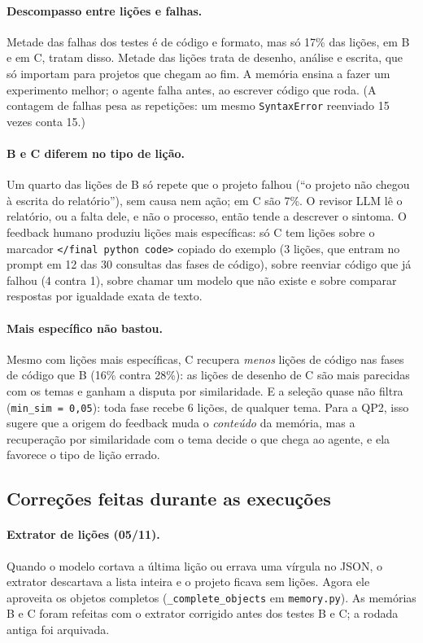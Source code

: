 \documentclass[11pt,a4paper]{article}
\begin{document}
\paragraph{Descompasso entre lições e falhas.} Metade das falhas dos testes é de código e formato,
mas só 17\% das lições, em B e em C, tratam disso. Metade das lições trata de desenho, análise e
escrita, que só importam para projetos que chegam ao fim. A memória ensina a fazer um
experimento melhor; o agente falha antes, ao escrever código que roda. (A contagem de falhas
pesa as repetições: um mesmo \texttt{SyntaxError} reenviado 15 vezes conta 15.)

\paragraph{B e C diferem no tipo de lição.} Um quarto das lições de B só repete que o projeto
falhou (``o projeto não chegou à escrita do relatório''), sem causa nem ação; em C são 7\%. O
revisor LLM lê o relatório, ou a falta dele, e não o processo, então tende a descrever o sintoma.
O feedback humano produziu lições mais específicas: só C tem lições sobre o marcador
\verb|</final python code>| copiado do exemplo (3 lições, que entram no prompt em 12 das 30
consultas das fases de código), sobre reenviar código que já falhou (4 contra 1), sobre chamar
um modelo que não existe e sobre comparar respostas por igualdade exata de texto.

\paragraph{Mais específico não bastou.} Mesmo com lições mais específicas, C recupera
\emph{menos} lições de código nas fases de código que B (16\% contra 28\%): as lições de desenho
de C são mais parecidas com os temas e ganham a disputa por similaridade. E a seleção quase não
filtra (\texttt{min\_sim = 0,05}): toda fase recebe 6 lições, de qualquer tema. Para a QP2, isso
sugere que a origem do feedback muda o \emph{conteúdo} da memória, mas a recuperação por
similaridade com o tema decide o que chega ao agente, e ela favorece o tipo de lição errado.

\subsection{Correções feitas durante as execuções}

\paragraph{Extrator de lições (05/11).} Quando o modelo cortava a última lição ou errava uma
vírgula no JSON, o extrator descartava a lista inteira e o projeto ficava sem lições. Agora ele
aproveita os objetos completos (\texttt{\_complete\_objects} em \texttt{memory.py}). As memórias
B e C foram refeitas com o extrator corrigido antes dos testes B e C; a rodada antiga foi
arquivada.
\end{document}
